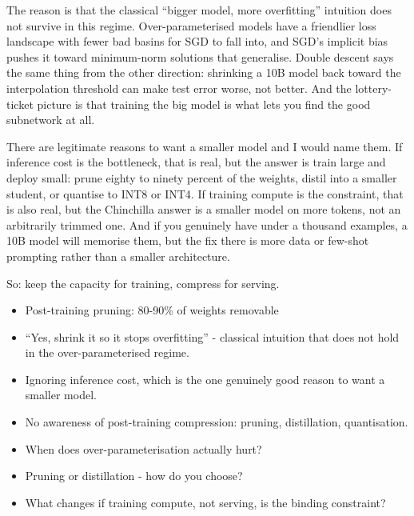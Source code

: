 \documentclass[10pt,twoside]{book}
\newcommand{\lab}[1]{\par\vspace{5pt}\noindent{\sffamily\footnotesize\bfseries\color{accent}#1}\par\vspace{1pt}}
\newcommand{\flab}[1]{\par\vspace{5pt}\noindent{\sffamily\footnotesize\bfseries\color{flag}#1}\par\vspace{1pt}}
\begin{document}
The reason is that the classical ``bigger model, more overfitting'' intuition does not survive in this regime. Over-parameterised models have a friendlier loss landscape with fewer bad basins for SGD to fall into, and SGD's implicit bias pushes it toward minimum-norm solutions that generalise. Double descent says the same thing from the other direction: shrinking a 10B model back toward the interpolation threshold can make test error worse, not better. And the lottery-ticket picture is that training the big model is what lets you find the good subnetwork at all.\par\vspace{3pt}
There are legitimate reasons to want a smaller model and I would name them. If inference cost is the bottleneck, that is real, but the answer is train large and deploy small: prune eighty to ninety percent of the weights, distil into a smaller student, or quantise to INT8 or INT4. If training compute is the constraint, that is also real, but the Chinchilla answer is a smaller model on more tokens, not an arbitrarily trimmed one. And if you genuinely have under a thousand examples, a 10B model will memorise them, but the fix there is more data or few-shot prompting rather than a smaller architecture.\par\vspace{3pt}
So: keep the capacity for training, compress for serving.\par\vspace{3pt}
\lab{Numbers}
\begin{itemize}
\item Post-training pruning: 80-90\% of weights removable
\end{itemize}
\flab{Loses the signal}
\begin{itemize}
\item ``Yes, shrink it so it stops overfitting'' - classical intuition that does not hold in the over-parameterised regime.
\item Ignoring inference cost, which is the one genuinely good reason to want a smaller model.
\item No awareness of post-training compression: pruning, distillation, quantisation.
\end{itemize}
\lab{Then they ask}
\begin{itemize}
\item When does over-parameterisation actually hurt?
\item Pruning or distillation - how do you choose?
\item What changes if training compute, not serving, is the binding constraint?
\end{itemize}
\end{document}
